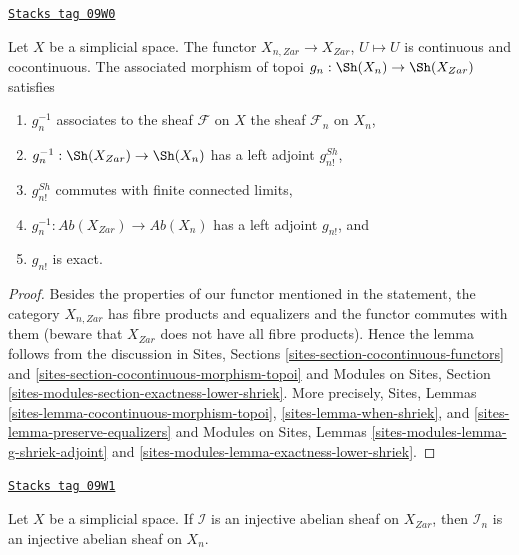 \begin{lemma}
\label{spaces-simplicial-lemma-restriction-to-components}
\href{https://stacks.math.columbia.edu/tag/09W0}{\texttt{Stacks tag 09W0}}

Let $X$ be a simplicial space. The functor
$X_{n, Zar} \to X_{Zar}$, $U \mapsto U$ is continuous
and cocontinuous. The associated morphism of
topoi $g_n : \Sh(X_n) \to \Sh(X_{Zar})$ satisfies
\begin{enumerate}
\item $g_n^{-1}$ associates to the sheaf $\mathcal{F}$ on $X$
the sheaf $\mathcal{F}_n$ on $X_n$,
\item $g_n^{-1} : \Sh(X_{Zar}) \to \Sh(X_n)$ has a left adjoint $g^{Sh}_{n!}$,
\item $g^{Sh}_{n!}$ commutes with finite connected limits,
\item $g_n^{-1} : \textit{Ab}(X_{Zar}) \to \textit{Ab}(X_n)$
has a left adjoint $g_{n!}$, and
\item $g_{n!}$ is exact.
\end{enumerate}
\end{lemma}

\begin{proof}
Besides the properties of our functor mentioned in the statement,
the category $X_{n, Zar}$ has fibre products and equalizers
and the functor commutes with them (beware that $X_{Zar}$ does not
have all fibre products). Hence the lemma follows from the discussion in
Sites, Sections \ref{sites-section-cocontinuous-functors} and
\ref{sites-section-cocontinuous-morphism-topoi}
and
Modules on Sites, Section \ref{sites-modules-section-exactness-lower-shriek}.
More precisely,
Sites, Lemmas \ref{sites-lemma-cocontinuous-morphism-topoi},
\ref{sites-lemma-when-shriek}, and
\ref{sites-lemma-preserve-equalizers}
and
Modules on Sites, Lemmas
\ref{sites-modules-lemma-g-shriek-adjoint} and
\ref{sites-modules-lemma-exactness-lower-shriek}.
\end{proof}

\begin{lemma}
\label{spaces-simplicial-lemma-restriction-injective-to-component}
\href{https://stacks.math.columbia.edu/tag/09W1}{\texttt{Stacks tag 09W1}}

Let $X$ be a simplicial space. If $\mathcal{I}$ is an injective abelian
sheaf on $X_{Zar}$, then $\mathcal{I}_n$ is an injective abelian sheaf
on $X_n$.
\end{lemma}

